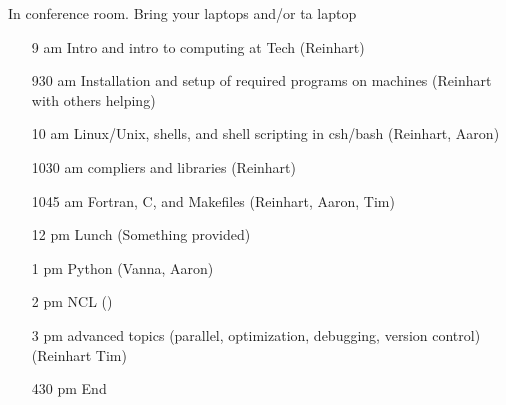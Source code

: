 \documentclass[11pt]{amsart}
\begin{document}
In conference room. Bring your laptops and/or ta laptop
\begin{itemize}
\item[9 am] Intro and intro to computing at Tech (Reinhart)
\item[930 am] Installation and setup of required programs on machines (Reinhart with others helping)
\item[10 am] Linux/Unix, shells, and shell scripting in csh/bash (Reinhart, Aaron)
\item[1030 am] compliers and libraries (Reinhart)
\item[1045 am] Fortran, C, and Makefiles (Reinhart, Aaron, Tim)
\item[12 pm] Lunch (Something provided)
\item[1 pm] Python (Vanna, Aaron)
\item[2 pm] NCL ()
\item[3 pm] advanced topics (parallel, optimization, debugging, version control) (Reinhart Tim)
\item[430 pm] End
\end{itemize}
\end{document}
